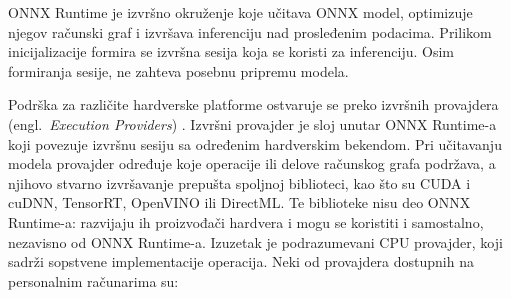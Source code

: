 \documentclass[12pt,a4paper]{article}
\begin{document}
ONNX Runtime \cite{ONNXRuntime} je izvršno okruženje koje učitava ONNX model, optimizuje njegov računski graf i izvršava inferenciju nad prosleđenim podacima. Prilikom inicijalizacije formira se izvršna sesija koja se koristi za inferenciju. Osim formiranja sesije, ne zahteva posebnu pripremu modela.

Podrška za različite hardverske platforme ostvaruje se preko izvršnih provajdera (engl.\ \textit{Execution Providers}) \cite{ORT_EP}. Izvršni provajder je sloj unutar ONNX Runtime-a koji povezuje izvršnu sesiju sa određenim hardverskim bekendom. Pri učitavanju modela provajder određuje koje operacije ili delove računskog grafa podržava, a njihovo stvarno izvršavanje prepušta spoljnoj biblioteci, kao što su CUDA i cuDNN, TensorRT, OpenVINO ili DirectML. Te biblioteke nisu deo ONNX Runtime-a: razvijaju ih proizvođači hardvera i mogu se koristiti i samostalno, nezavisno od ONNX Runtime-a. Izuzetak je podrazumevani CPU provajder, koji sadrži sopstvene implementacije operacija. Neki od provajdera dostupnih na personalnim računarima su:
\end{document}
